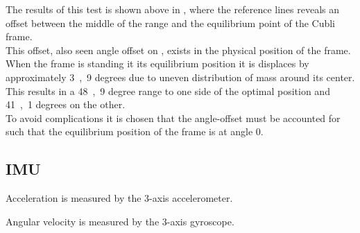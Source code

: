 \begin{minipage}{\linewidth}
\begin{minipage}{0.45\linewidth}
\begin{figure}[H]
  			\centering
  			\captionsetup{justification=centering}
  			\vspace{-.5cm}
  			\label{PotentiometerResolutionRadDeg}
  		\end{figure}\vspace{-5mm}
  	\end{minipage}
\end{minipage}

The results of this test is shown above in , where the reference lines reveals an offset between the middle of the range and the equilibrium point of the Cubli frame.\\
This offset, also seen angle offset on , exists in the physical position of the frame. When the frame is standing it its equilibrium position it is displaces by approximately \si{3,9} degrees due to uneven distribution of mass around its center.\\
This results in a \si{48,9} degree range to one side of the optimal position and \si{41,1} degrees on the other.\\
To avoid complications it is chosen that the angle-offset must be accounted for such that the equilibrium position of the frame is at angle 0.


\subsection{IMU}
Acceleration is measured by the 3-axis accelerometer.

Angular velocity is measured by the 3-axis gyroscope. 
